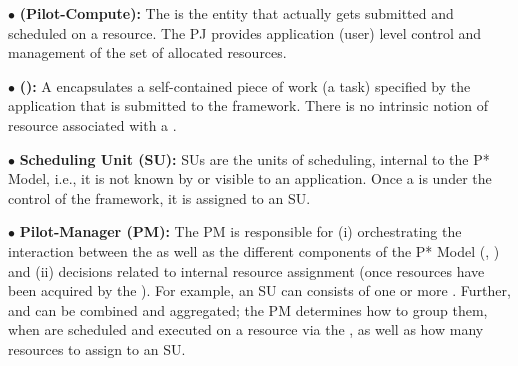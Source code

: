 \documentclass{sig-alternate}
\begin{document}




\noindent$\bullet$ \textbf{\pilot (Pilot-Compute):} The \pilot is the
  entity that actually gets submitted and scheduled on a resource.
  The PJ provides application (user)
  level control and management of the set of allocated resources.



\noindent$\bullet$ \textbf{\computeunit  (\cu):} A \cu  encapsulates a 
  self-contained piece of work (a task) specified by the application that is
  submitted to the \pilotjob framework. There is no intrinsic notion
  of resource associated with a \cu.

\noindent$\bullet$ \textbf{Scheduling Unit (SU):} SUs are the units of 
  scheduling, internal to the P* Model, i.e., it is not known by or
  visible to an application. Once a \cu is
  under the control of the \pilotjob framework, it is assigned
  to an SU.

\noindent$\bullet$ \textbf{Pilot-Manager (PM):} The PM is responsible for (i)
  orchestrating the interaction between the \pilots as well as the
  different components of the P* Model (\cus, \sus) and (ii) decisions
  related to internal resource assignment (once resources have been
  acquired by the \pilotjob).  For example, an SU can consists of one
  or more \cus. Further, \cus and \sus can be combined and aggregated;
  the PM determines how to group them, when \sus are scheduled and
  executed on a resource via the \pilot, as well as how many resources
  to assign to an SU.
\end{document}
